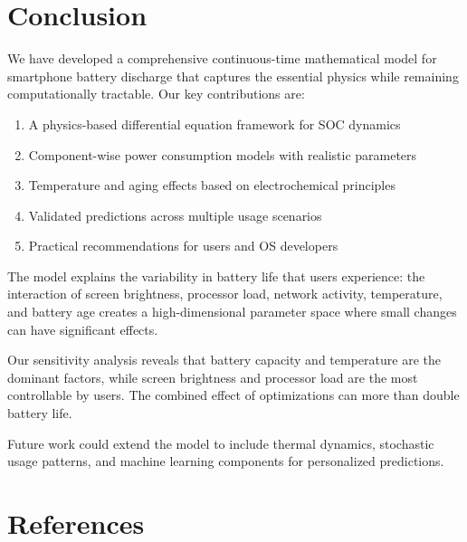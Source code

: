 \documentclass[12pt]{article}
\begin{document}
\section{Conclusion}

We have developed a comprehensive continuous-time mathematical model for smartphone battery discharge that captures the essential physics while remaining computationally tractable. Our key contributions are:

\begin{enumerate}
    \item A physics-based differential equation framework for SOC dynamics
    \item Component-wise power consumption models with realistic parameters
    \item Temperature and aging effects based on electrochemical principles
    \item Validated predictions across multiple usage scenarios
    \item Practical recommendations for users and OS developers
\end{enumerate}

The model explains the variability in battery life that users experience: the interaction of screen brightness, processor load, network activity, temperature, and battery age creates a high-dimensional parameter space where small changes can have significant effects.

Our sensitivity analysis reveals that battery capacity and temperature are the dominant factors, while screen brightness and processor load are the most controllable by users. The combined effect of optimizations can more than double battery life.

Future work could extend the model to include thermal dynamics, stochastic usage patterns, and machine learning components for personalized predictions.

\section*{References}
\end{document}
